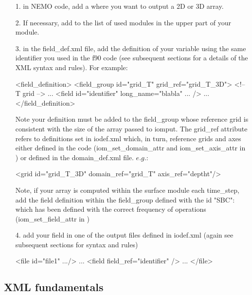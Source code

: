 \documentclass[../tex_main/NEMO_manual]{subfiles}
\begin{document}
\begin{enumerate}
\item[1.]
  in NEMO code, add a  where you want to output a 2D or 3D array.
\item[2.]
  If necessary, add  to the list of used modules in
  the upper part of your module.
\item[3.]
  in the field\_def.xml file, add the definition of your variable using the same identifier you used in the f90 code
  (see subsequent sections for a details of the XML syntax and rules).
  For example:

\begin{xmllines}
<field_definition>
	<field_group id="grid_T" grid_ref="grid_T_3D"> <!-- T grid -->
	...
		<field id="identifier" long_name="blabla" ... />   
		...
</field_definition> 
\end{xmllines}

Note your definition must be added to the field\_group whose reference grid is consistent with the size of
the array passed to iomput.
The grid\_ref attribute refers to definitions set in iodef.xml which, in turn,
reference grids and axes either defined in the code
(iom\_set\_domain\_attr and iom\_set\_axis\_attr in ) or defined in the domain\_def.xml file.
$e.g.$:

\begin{xmllines}
<grid id="grid_T_3D" domain_ref="grid_T" axis_ref="deptht"/>
\end{xmllines}

Note, if your array is computed within the surface module each  time\_step,
add the field definition within the field\_group defined with the id "SBC":
 which has been defined with the correct frequency of operations
(iom\_set\_field\_attr in )
\item[4.]
  add your field in one of the output files defined in iodef.xml
  (again see subsequent sections for syntax and rules)

\begin{xmllines}
<file id="file1" .../>   
...
	<field field_ref="identifier" />   
	...
</file>   
\end{xmllines}

\end{enumerate}

\subsection{XML fundamentals}
\end{document}
